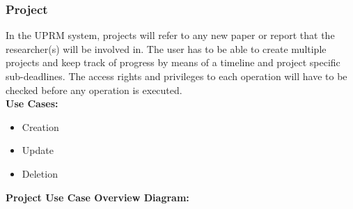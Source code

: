 \subsubsection{Project}
	In the UPRM system, projects will refer to any new paper or report that the researcher(s) will be involved in. The user has to be able to create multiple projects and keep track of progress by means of a timeline and project specific sub-deadlines.
	The access rights and privileges to each operation will have to be checked before any operation is executed.\\
	\textbf{Use Cases:}
	\begin{itemize}
		\item Creation
		\item Update
		\item Deletion
	\end{itemize}
	\textbf{Project Use Case Overview Diagram:}\\
	\centerline{}		
	
